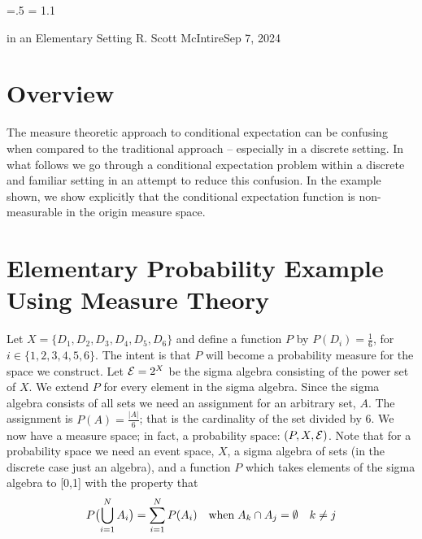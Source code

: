 




\parindent=0pt
\parskip=.5\baselineskip
\baselineskip = 1.1\baselineskip

\footline{\hss\tenrm\folio\hss}

        {in an Elementary Setting}
{R. Scott McIntire}{Sep 7, 2024}

\section{Overview}
The measure theoretic approach to conditional expectation can be confusing
when compared to the traditional approach -- especially in a discrete 
setting. In what follows we go through a conditional 
expectation problem within a discrete and familiar setting in an attempt 
to reduce this confusion. In the example shown, we show explicitly that the 
conditional expectation function is non-measurable in the origin 
measure space.


\section{Elementary Probability Example Using Measure Theory}
Let $X = \{D_1, D_2, D_3, D_4, D_5, D_6\}$ and define a function $P$ by 
$P(D_i) = \frac{1}{6}$, for $i\in \{1,2,3,4,5,6\}$. The intent is that $P$ will 
become a probability measure for the space we construct.
Let ${\cal E} = 2^X$ be the sigma  algebra 
consisting of the power set of $X$. We extend $P$ for every element in the sigma algebra.
Since the sigma algebra consists of all sets 
we need an assignment for an arbitrary set, $A$. 
The assignment is $P(A) = \frac{|A|}{6}$; that is the cardinality of the set divided by 6.
We now have a measure space; in fact, a probability space: $(P,X,{\cal E})$.
Note that for a probability space we need an event space, $X$, a sigma algebra of sets 
(in the discrete case just an algebra), and a function $P$ which takes 
elements of the sigma algebra to [0,1] with the property that 
$$
P\bigl(\mathop{\bigcup}_{i=1}^N A_i\bigr) = \sum_{i=1}^N P(A_i) 
\quad {\rm when}\;  A_k \cap A_j = \emptyset \quad k\neq j
$$


